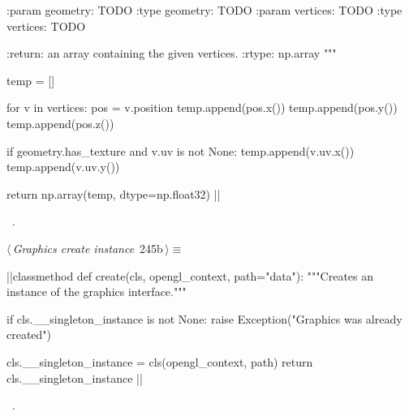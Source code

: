 \documentclass[%
    a4paper,    %
    justified,  %
    nobib,      %
    openany     %
]{tufte-book}
\makeatletter
\renewcommand{\label}[1]{\@tufte@label{##1}}%
\makeatother
\begin{document}
\begin{fullwidth}
\begin{flushleft}
\begin{minipage}{\linewidth}
\begin{pythoncode}
    :param geometry: TODO
    :type geometry: TODO
    :param vertices: TODO
    :type vertices: TODO

    :return: an array containing the given vertices.
    :rtype:  np.array
    """

    temp = []

    for v in vertices:
        pos = v.position
        temp.append(pos.x())
        temp.append(pos.y())
        temp.append(pos.z())

        if geometry.has_texture and v.uv is not None:
            temp.append(v.uv.x())
            temp.append(v.uv.y())

    return np.array(temp, dtype=np.float32)
|\NWsep|
\end{pythoncode}
\vspace{1.5ex}
\footnotesize
\begin{list}{}{\setlength{\itemsep}{-\parsep}\setlength{\itemindent}{-\leftmargin}}
\item \NWtxtMacroRefIn\ .

\item{}
\end{list}
\end{minipage}\vspace{4ex}
\end{flushleft}
\begin{flushleft} \small
\begin{minipage}{\linewidth}\label{scrap266}\raggedright\small
{} $\langle\,${\itshape Graphics create instance}\nobreak\ {\footnotesize {245b}}$\,\rangle\equiv$
\vspace{-1ex}
\begin{pythoncode}
|\normalfont{}\fontfamily{}|classmethod
def create(cls, opengl_context, path="data"):
    """Creates an instance of the graphics interface."""

    if cls.__singleton_instance is not None:
        raise Exception("Graphics was already created")

    cls.__singleton_instance = cls(opengl_context, path)
    return cls.__singleton_instance
|\NWsep|
\end{pythoncode}
\vspace{1.5ex}
\footnotesize
\begin{list}{}{\setlength{\itemsep}{-\parsep}\setlength{\itemindent}{-\leftmargin}}
\item \NWtxtMacroRefIn\ .


\end{list}
\end{minipage}
\end{flushleft}
\end{fullwidth}
\end{document}
